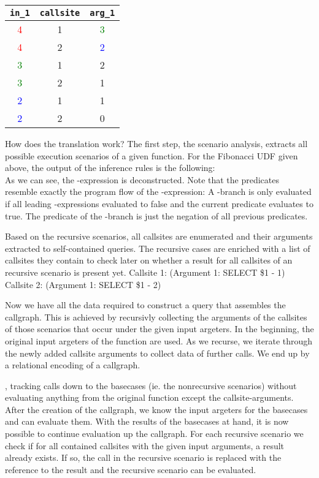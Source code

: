 \begin{tabular}{c|c|c}
\texttt{in\_1} & \texttt{callsite} & \texttt{arg\_1} \\
\hline
\hline
\textcolor{red}{4} & 1 & \textcolor{green}{3} \\
\textcolor{red}{4} & 2 & \textcolor{blue}{2} \\
\hline
\textcolor{green}{3} & 1 & 2 \\
\textcolor{green}{3} & 2 & 1 \\
\hline
\textcolor{blue}{2} & 1 & 1 \\
\textcolor{blue}{2} & 2 & 0 \\ 
\end{tabular}


How does the translation work? The first step, the scenario analysis, extracts all possible execution scenarios of a given function. For the Fibonacci UDF given above, the output of the inference rules is the following:\\

As we can see, the \CASE-expression is deconstructed. Note that the predicates resemble exactly the program flow of the \CASE-expression: A \THEN-branch is only evaluated if all leading \WHEN-expressions evaluated to false and the current predicate evaluates to true. The predicate of the \ELSE-branch is just the negation of all previous predicates.



Based on the recursive scenarios, all callsites are enumerated and their arguments extracted to self-contained queries. The recursive cases are enriched with a list of callsites they contain to check later on whether a result for all callsites of an recursive scenario is present yet.
  Callsite 1: (Argument 1: SELECT \$1 - 1) 
  Callsite 2: (Argument 1: SELECT \$1 - 2)
  
Now we have all the data required to construct a query that assembles the callgraph. This is achieved by recursivly collecting the arguments of the callsites of those scenarios that occur under the given input argeters. In the beginning, the original input argeters of the function are used. As we recurse, we iterate through the newly added callsite arguments to collect data of further calls. We end up by a relational encoding of a callgraph.


, tracking calls down to the basecases (ie. the nonrecursive scenarios) without evaluating anything from the original function except the callsite-arguments. After the creation of the callgraph, we know the input argeters for the basecases and can evaluate them. With the results of the basecases at hand, it is now possible to continue evaluation up the callgraph. For each recursive scenario we check if for all contained callsites with the given input arguments, a result already exists. If so, the call in the recursive scenario is replaced with the reference to the result and the recursive scenario can be evaluated.

